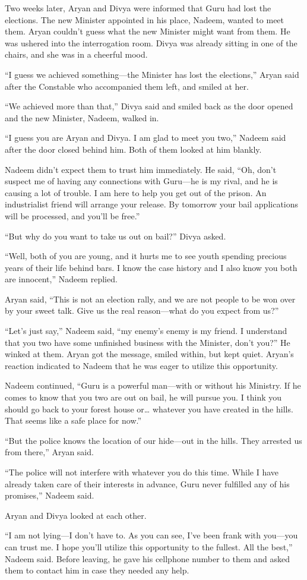 Two weeks later, Aryan and Divya were informed that Guru had lost the elections.
The new Minister appointed in his place, Nadeem, wanted to meet them. Aryan
couldn't guess what the new Minister might want from them. He was ushered into
the interrogation room. Divya was already sitting in one of the chairs, and she
was in a cheerful mood.

“I guess we achieved something—the Minister has lost the elections,” Aryan
said after the Constable who accompanied them left, and smiled at her.

“We achieved more than that,” Divya said and smiled back as the door opened and
the new Minister, Nadeem, walked in.

“I guess you are Aryan and Divya. I am glad to meet you two,” Nadeem said after
the door closed behind him. Both of them looked at him blankly.

Nadeem didn't expect them to trust him immediately. He said, “Oh, don't suspect
me of having any connections with Guru—he is my rival, and he is causing a lot of
trouble. I am here to help you get out of the prison. An industrialist friend
will arrange your release. By tomorrow your bail applications will be processed,
and you'll be free.”

“But why do you want to take us out on bail?” Divya asked.

“Well, both of you are young, and it hurts me to see youth spending precious
years of their life behind bars. I know the case history and I also know you
both are innocent,” Nadeem replied.

Aryan said, “This is not an election rally, and we are not people to be won over
by your sweet talk. Give us the real reason—what do you expect from us?”

“Let's just say,” Nadeem said, “my enemy's enemy is my friend. I understand that
you two have some unfinished business with the Minister, don't you?” He winked
at them. Aryan got the message, smiled within, but kept quiet. Aryan's reaction
indicated to Nadeem that he was eager to utilize this opportunity.

Nadeem continued, “Guru is a powerful man—with or without his Ministry. If he
comes to know that you two are out on bail, he will pursue you. I think you
should go back to your forest house or… whatever you have created in the
hills. That seems like a safe place for now.”

“But the police knows the location of our hide—out in the hills. They arrested
us from there,” Aryan said.

“The police will not interfere with whatever you do this time. While I have
already taken care of their interests in advance, Guru never fulfilled any of
his promises,” Nadeem said.

Aryan and Divya looked at each other.

“I am not lying—I don't have to. As you can see, I've been frank with you—you
can trust me. I hope you'll utilize this opportunity to the fullest. All the
best,” Nadeem said. Before leaving, he gave his cellphone number to them and
asked them to contact him in case they needed any help.